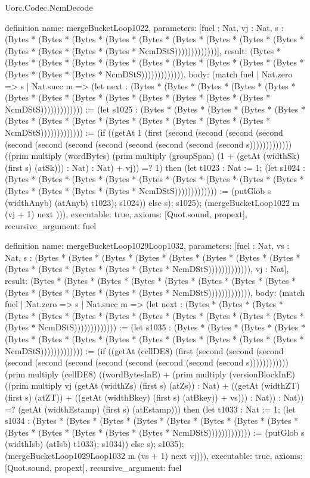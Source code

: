 \begin{lexlean}{Uorc.Codec.NcmDecode}
\begin{semanticmodule}
definition{
  name: mergeBucketLoop1022,
  parameters: [fuel : Nat, vj : Nat, s : (Bytes * (Bytes * (Bytes * (Bytes * (Bytes * (Bytes * (Bytes * (Bytes * (Bytes * (Bytes * (Bytes * (Bytes * (Bytes * NcmDStS)))))))))))))],
  result: (Bytes * (Bytes * (Bytes * (Bytes * (Bytes * (Bytes * (Bytes * (Bytes * (Bytes * (Bytes * (Bytes * (Bytes * (Bytes * NcmDStS))))))))))))),
  body: (match fuel
    | Nat.zero => s
    | Nat.succ m => (let next : (Bytes * (Bytes * (Bytes * (Bytes * (Bytes * (Bytes * (Bytes * (Bytes * (Bytes * (Bytes * (Bytes * (Bytes * (Bytes * NcmDStS))))))))))))) := (let s1025 : (Bytes * (Bytes * (Bytes * (Bytes * (Bytes * (Bytes * (Bytes * (Bytes * (Bytes * (Bytes * (Bytes * (Bytes * (Bytes * NcmDStS))))))))))))) := (if ((getAt 1 (first (second (second (second (second (second (second (second (second (second (second (second (second s))))))))))))) ((prim multiply (wordBytes) (prim multiply (groupSpan) (1 + (getAt (widthSk) (first s) (atSk))) : Nat) : Nat) + vj)) =? 1) then (let t1023 : Nat := 1; (let s1024 : (Bytes * (Bytes * (Bytes * (Bytes * (Bytes * (Bytes * (Bytes * (Bytes * (Bytes * (Bytes * (Bytes * (Bytes * (Bytes * NcmDStS))))))))))))) := (putGlob s (widthAnyb) (atAnyb) t1023); s1024)) else s); s1025); (mergeBucketLoop1022 m (vj + 1) next ))),
  executable: true,
  axioms: [Quot.sound, propext],
  recursive_argument: fuel
}

definition{
  name: mergeBucketLoop1029Loop1032,
  parameters: [fuel : Nat, vs : Nat, s : (Bytes * (Bytes * (Bytes * (Bytes * (Bytes * (Bytes * (Bytes * (Bytes * (Bytes * (Bytes * (Bytes * (Bytes * (Bytes * NcmDStS))))))))))))), vj : Nat],
  result: (Bytes * (Bytes * (Bytes * (Bytes * (Bytes * (Bytes * (Bytes * (Bytes * (Bytes * (Bytes * (Bytes * (Bytes * (Bytes * NcmDStS))))))))))))),
  body: (match fuel
    | Nat.zero => s
    | Nat.succ m => (let next : (Bytes * (Bytes * (Bytes * (Bytes * (Bytes * (Bytes * (Bytes * (Bytes * (Bytes * (Bytes * (Bytes * (Bytes * (Bytes * NcmDStS))))))))))))) := (let s1035 : (Bytes * (Bytes * (Bytes * (Bytes * (Bytes * (Bytes * (Bytes * (Bytes * (Bytes * (Bytes * (Bytes * (Bytes * (Bytes * NcmDStS))))))))))))) := (if ((getAt (cellDE8) (first (second (second (second (second (second (second (second (second (second (second (second s)))))))))))) (prim multiply (cellDE8) ((wordBytesInE) + (prim multiply (versionBlockInE) ((prim multiply vj (getAt (widthZs) (first s) (atZs)) : Nat) + ((getAt (widthZT) (first s) (atZT)) + ((getAt (widthBkey) (first s) (atBkey)) + vs))) : Nat)) : Nat)) =? (getAt (widthEstamp) (first s) (atEstamp))) then (let t1033 : Nat := 1; (let s1034 : (Bytes * (Bytes * (Bytes * (Bytes * (Bytes * (Bytes * (Bytes * (Bytes * (Bytes * (Bytes * (Bytes * (Bytes * (Bytes * NcmDStS))))))))))))) := (putGlob s (widthIsb) (atIsb) t1033); s1034)) else s); s1035); (mergeBucketLoop1029Loop1032 m (vs + 1) next vj))),
  executable: true,
  axioms: [Quot.sound, propext],
  recursive_argument: fuel
}


\end{semanticmodule}
\end{lexlean}
